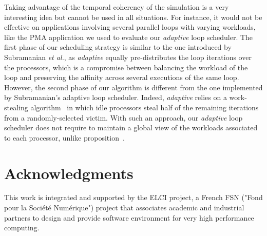 \documentclass{Styles/llncs}
\begin{document}
Taking advantage of the temporal coherency of the simulation is a very
interesting idea but cannot be used in all situations. For instance,
it would not be effective on applications involving several parallel
loops with varying workloads, like the PMA application we used to
evaluate our \textit{adaptive} loop scheduler. The first phase of our
scheduling strategy is similar to the one introduced by Subramanian
\textit{et al.}, as \textit{adaptive} equally pre-distributes the loop
iterations over the processors, which is a compromise between
balancing the workload of the loop and preserving the affinity across
several executions of the same loop. However, the second phase of our
algorithm is different from the one implemented by Subramanian's
adaptive loop scheduler. Indeed, \textit{adaptive} relies on a
work-stealing algorithm~\cite{Frigo:1998:ICM:277652.277725} in which
idle processors steal half of the remaining iterations from a
randomly-selected victim. With such an approach, our \textit{adaptive}
loop scheduler does not require to maintain a global view of the
workloads associated to each processor, unlike
proposition~\cite{Subramaniam:1994}.



\section*{Acknowledgments}


This work is integrated and supported by the ELCI  project, a French FSN ("Fond pour la Société Numérique")
project that associates academic and industrial partners to design and provide software environment for very high performance
computing.
  \small 

\end{document}
